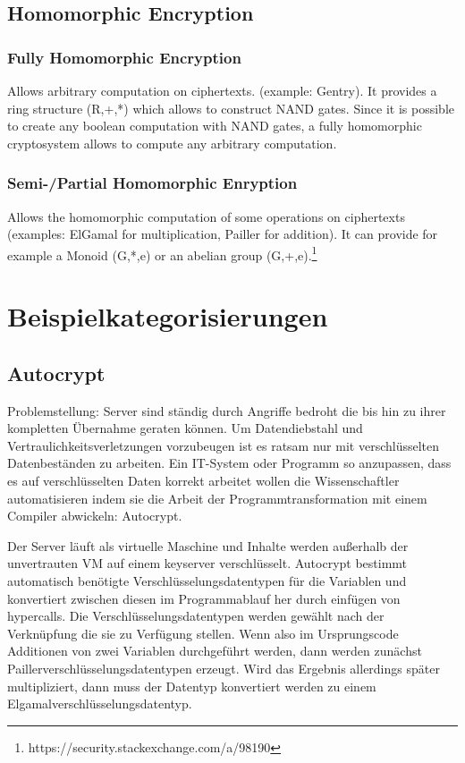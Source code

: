 \documentclass[12pt,a4paper]{scrartcl}				%
\begin{document}
\subsection*{Homomorphic Encryption}


\subsubsection*{Fully Homomorphic Encryption}
Allows arbitrary computation on ciphertexts. (example: Gentry). It provides a ring structure (R,+,*) which allows to construct NAND gates. Since it is possible to create any boolean computation with NAND gates, a fully homomorphic cryptosystem allows to compute any arbitrary computation.

\subsubsection*{Semi-/Partial Homomorphic Enryption}
Allows the homomorphic computation of some operations on ciphertexts (examples: ElGamal for multiplication, Pailler for addition). It can provide for example a Monoid (G,*,e) or an abelian group (G,+,e).\footnote{https://security.stackexchange.com/a/98190}
\newpage

\section*{Beispielkategorisierungen}
\subsection*{Autocrypt} \cite{tople2013autocrypt}
Problemstellung: Server sind ständig durch Angriffe bedroht die bis hin zu ihrer kompletten Übernahme geraten können. Um Datendiebstahl und Vertraulichkeitsverletzungen vorzubeugen ist es ratsam nur mit verschlüsselten Datenbeständen zu arbeiten. Ein IT-System oder Programm so anzupassen, dass es auf verschlüsselten Daten korrekt arbeitet wollen die Wissenschaftler automatisieren indem sie die Arbeit der Programmtransformation mit einem Compiler abwickeln: Autocrypt.

Der Server läuft als virtuelle Maschine und Inhalte werden außerhalb der unvertrauten VM auf einem keyserver verschlüsselt. Autocrypt bestimmt automatisch benötigte Verschlüsselungsdatentypen für die Variablen und konvertiert zwischen diesen im Programmablauf her durch einfügen von hypercalls. Die Verschlüsselungsdatentypen werden gewählt nach der Verknüpfung die sie zu Verfügung stellen. Wenn also im Ursprungscode Additionen von zwei Variablen durchgeführt werden, dann werden zunächst Paillerverschlüsselungsdatentypen erzeugt. Wird das Ergebnis allerdings später multipliziert, dann muss der Datentyp konvertiert werden zu einem Elgamalverschlüsselungsdatentyp.
\end{document}
